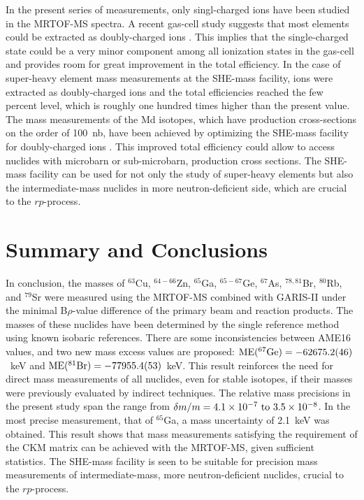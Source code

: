 \documentclass[3p]{elsarticle}
\begin{document}
In the present series of measurements, only singl-charged ions have been studied in the MRTOF-MS spectra. A recent gas-cell study suggests that most elements could be extracted as doubly-charged ions \citep{Schury2017b}. This implies that the single-charged state could be a very minor component among all ionization states in the gas-cell and provides room for great improvement in the total efficiency.  In the case of super-heavy element mass measurements at the SHE-mass facility, ions were extracted as doubly-charged ions and the total efficiencies reached the few percent level, which is roughly one hundred times higher than the present value. The mass measurements of the Md isotopes, which have production cross-sections on the order of 100~nb, have been achieved by optimizing the SHE-mass facility for doubly-charged ions \citep{Ito2017submitted}. This improved total efficiency could allow to access nuclides with microbarn or sub-microbarn, production cross sections. The SHE-mass facility can be used for not only the study of super-heavy elements but also the intermediate-mass nuclides in more neutron-deficient side, which are crucial to the $rp$-process.

\section{Summary and Conclusions}

In conclusion, the masses of $^{63}$Cu, $^{64-66}$Zn, $^{65}$Ga, $^{65-67}$Ge, $^{67}$As, $^{78,81}$Br, $^{80}$Rb, and $^{79}$Sr  were measured using the MRTOF-MS combined with GARIS-II under the minimal B$\rho$-value difference of the primary beam and reaction products. The masses of these nuclides have been determined by the single reference method using known isobaric references. There are some inconsistencies between AME16 values, and two new mass excess values are proposed: ${\rm ME (^{67}Ge)} = -62675.2(46)$~keV and ${\rm ME (^{81}Br)} = -77955.4(53)$~keV. This result reinforces the need for direct mass measurements of all nuclides, even for stable isotopes, if their masses were previously evaluated by indirect techniques. The relative mass precisions in the present study span the range from  $\delta m/m = 4.1\times10^{-7}~{\rm to}~ 3.5\times10^{-8}$. In the most precise measurement, that of $^{65}$Ga, a mass uncertainty of 2.1~keV was obtained. This result shows that mass measurements satisfying the requirement of the CKM matrix can be achieved with the MRTOF-MS, given sufficient statistics. The SHE-mass facility is seen to be suitable for precision mass measurements of intermediate-mass, more neutron-deficient nuclides, crucial to the $rp$-process. \\
\end{document}
